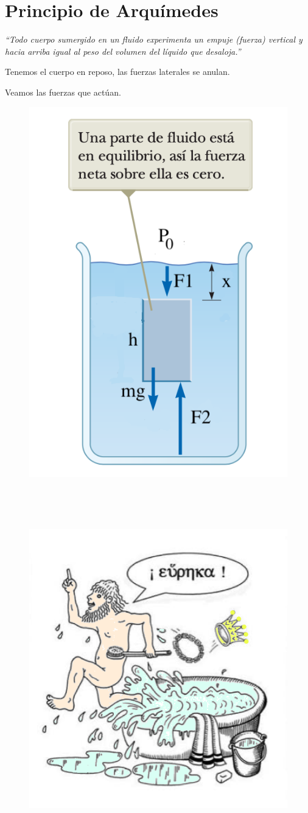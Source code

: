 \vspace{20mm} %

\section{Principio de Arquímedes}

\emph{``Todo cuerpo sumergido en un fluido experimenta un empuje (fuerza) vertical y hacia arriba igual al peso del volumen del líquido que desaloja.''}


Tenemos el cuerpo en reposo, las fuerzas laterales se anulan. 

Veamos las fuerzas que actúan.

\vspace{20mm} %

\begin{multicols}{2}
\begin{figure}[H]
	\centering
	\includegraphics[width=.5\textwidth]{imagenes/imagenes07/T07IM09.png}
\end{figure}

$\quad$

$\quad$

\begin{figure}[H]
	\centering
	\includegraphics[width=.5\textwidth]{imagenes/imagenes07/T07IM08.png}
\end{figure}
\end{multicols}


